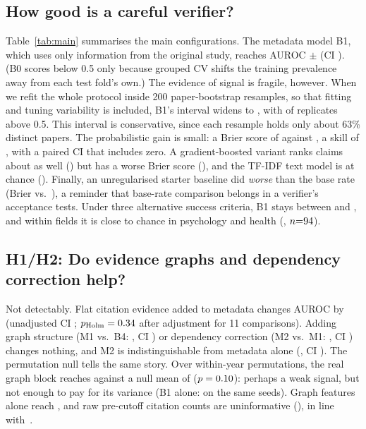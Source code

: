 \documentclass[conference]{IEEEtran}
\begin{document}
\subsection{How good is a careful verifier?}
Table~\ref{tab:main} summarises the main configurations. The metadata model B1, which uses only information from the original study, reaches AUROC \aucBone{}$\pm$\sdBone{} (CI \ciBone{}). (B0 scores below 0.5 only because grouped CV shifts the training prevalence away from each test fold's own.) The evidence of signal is fragile, however. When we refit the whole protocol inside 200 paper-bootstrap resamples, so that fitting and tuning variability is included, B1's interval widens to \rfBoneCi{}, with \rfBoneGt{} of replicates above 0.5. This interval is conservative, since each resample holds only about 63\% distinct papers. The probabilistic gain is small: a Brier score of \brierBone{} against \brierBzero{}, a skill of \bssBone{}, with a paired CI that includes zero. A gradient-boosted variant ranks claims about as well (\aucBgbt{}) but has a worse Brier score (\brierBgbt{}), and the TF-IDF text model is at chance (\aucBtwo{}). Finally, an unregularised starter baseline did \emph{worse} than the base rate (Brier \starterBrier{} vs.\ \starterPrevBrier{}), a reminder that base-rate comparison belongs in a verifier's acceptance tests. Under three alternative success criteria, B1 stays between \sensLo{} and \sensHi{}, and within fields it is close to chance in psychology and health (\subPsych{}, $n{=}94{}$).



\subsection{H1/H2: Do evidence graphs and dependency correction help?}
Not detectably. Flat citation evidence added to metadata changes AUROC by \dBfourBone{} (unadjusted CI \dciBfourBone{}; $p_{\mathrm{Holm}}=0.34{}$ after adjustment for 11 comparisons). Adding graph structure (M1 vs.\ B4: \dMoneBfour{}, CI \dciMoneBfour{}) or dependency correction (M2 vs.\ M1: \dMtwoMone{}, CI \dciMtwoMone{}) changes nothing, and M2 is indistinguishable from metadata alone (\dMtwoBone{}, CI \dciMtwoBone{}). The permutation null tells the same story. Over \permK{} within-year permutations, the real graph block reaches \permReal{} against a null mean of \permNullMean{} ($p=0.10{}$): perhaps a weak signal, but not enough to pay for its variance (B1 alone: \permBone{} on the same seeds). Graph features alone reach \aucGonly{}, and raw pre-cutoff citation counts are uninformative (\fcitesAuc{}), in line with~\cite{serragarcia2021}.
\end{document}
